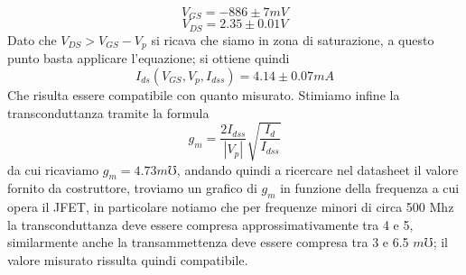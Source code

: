 \documentclass[10pt, a4paper, italian]{article}
\begin{document}
\[
V_{GS}=-886 \pm 7 mV
\]
\[
V_{DS}=2.35 \pm 0.01 V
\]
Dato che $V_{DS} > V_{GS} - V_p$ si ricava che siamo in zona di saturazione, a questo punto basta applicare l'equazione; si ottiene quindi 
\[
I_{ds}(V_{GS},V_p,I_{dss})=4.14 \pm 0.07 mA
\]
Che risulta essere compatibile con quanto misurato.
Stimiamo infine la transconduttanza tramite la formula
\begin{equation}
g_m = \frac{2 I_{dss}}{|V_p|}\sqrt{\frac{I_{d}}{I_{dss}}}
\end{equation}
da cui ricaviamo $g_m = 4.73 \si{m\mho}$, andando quindi a ricercare nel datasheet il valore fornito da costruttore, troviamo un grafico di $g_m$ in funzione della frequenza a cui opera il JFET, in particolare notiamo che per frequenze minori di circa 500 Mhz la transconduttanza deve essere compresa approssimativamente tra 4 e 5, similarmente anche la transammettenza deve essere compresa tra 3 e 6.5 $\si{m\mho}$; il valore misurato rissulta quindi compatibile.
\end{document}
